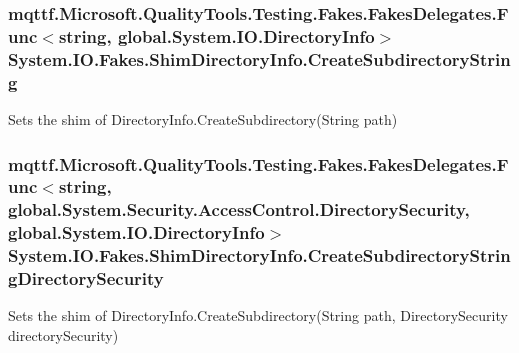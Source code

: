 \hypertarget{class_system_1_1_i_o_1_1_fakes_1_1_shim_directory_info_a87df951a72f08e47ebe185aceab18913}{
\subsubsection[{Create\-Subdirectory\-String}]{\setlength{\rightskip}{0pt plus 5cm}mqttf.\-Microsoft.\-Quality\-Tools.\-Testing.\-Fakes.\-Fakes\-Delegates.\-Func$<$string, global.\-System.\-I\-O.\-Directory\-Info$>$ System.\-I\-O.\-Fakes.\-Shim\-Directory\-Info.\-Create\-Subdirectory\-String\hspace{0.3cm}{\ttfamily [set]}}}\label{class_system_1_1_i_o_1_1_fakes_1_1_shim_directory_info_a87df951a72f08e47ebe185aceab18913}


Sets the shim of Directory\-Info.\-Create\-Subdirectory(\-String path)

\hypertarget{class_system_1_1_i_o_1_1_fakes_1_1_shim_directory_info_ad60e4272b3ffddf45efd9fff6f7cfc54}{
\subsubsection[{Create\-Subdirectory\-String\-Directory\-Security}]{\setlength{\rightskip}{0pt plus 5cm}mqttf.\-Microsoft.\-Quality\-Tools.\-Testing.\-Fakes.\-Fakes\-Delegates.\-Func$<$string, global.\-System.\-Security.\-Access\-Control.\-Directory\-Security, global.\-System.\-I\-O.\-Directory\-Info$>$ System.\-I\-O.\-Fakes.\-Shim\-Directory\-Info.\-Create\-Subdirectory\-String\-Directory\-Security\hspace{0.3cm}{\ttfamily [set]}}}\label{class_system_1_1_i_o_1_1_fakes_1_1_shim_directory_info_ad60e4272b3ffddf45efd9fff6f7cfc54}


Sets the shim of Directory\-Info.\-Create\-Subdirectory(\-String path, Directory\-Security directory\-Security)

